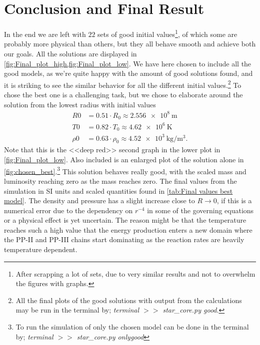 \documentclass[11pt,a4paper,twocolumn,titlepage]{article}
\begin{document}
\section{Conclusion and Final Result} \label{sec:Conclution}
In the end we are left with $22$ sets of good initial values\footnote{After scrapping a lot of sets, due to very similar results and not to overwhelm the figures with graphs.}, of which some are probably more physical than others, but they all behave smooth and achieve both our goals. All the solutions are displayed in \cref{fig:Final_plot_high,fig:Final_plot_low}. We have here chosen to include all the good models, as we're quite happy with the amount of good solutions found, and it is striking to see the similar behavior for all the different initial values.\footnote{All the final plots of the good solutions with output from the calculations may be run in the terminal by;  \textit{terminal $>>$ {star\_core.py} good}.} To chose the best one is a challenging task, but we chose to elaborate around the solution from the lowest radius with initial values
\begin{equation}
\begin{aligned}
R0 &= 0.51\cdot R_0 \approx \SI{2.556e8}{\meter}
\\
T0 &= 0.82\cdot T_0 \approx \SI{4.62e6}{\kelvin}
\\
\rho0 &= 0.63\cdot \rho_0 \approx \SI{4.52e3}{\kilogram\per\cubic\meter}.
\end{aligned}
\label{eq:Final_good_values}
\end{equation}
Note that this is the <<deep red>> second graph in the lower plot in \cref{fig:Final_plot_low}. Also included is an enlarged plot of the solution alone in \cref{fig:chosen_best}.\footnote{To run the simulation of only the chosen model can be done in the terminal by;  \textit{terminal $>>$ {star\_core.py} onlygood}} This solution behaves really good, with the scaled mass and luminosity reaching zero as the mass reaches zero. The final values from the simulation in SI units and scaled quantities found in \cref{tab:Final values best model}. The density and pressure has a slight increase close to $R \rightarrow 0$, if this is a numerical error due to the dependency on $r^{-4}$ in some of the governing equations or a physical effect is yet uncertain. The reason might be that the temperature reaches such a high value that the energy production enters a new domain where the PP-II and PP-III chains start dominating as the reaction rates are heavily temperature dependent.
\end{document}
